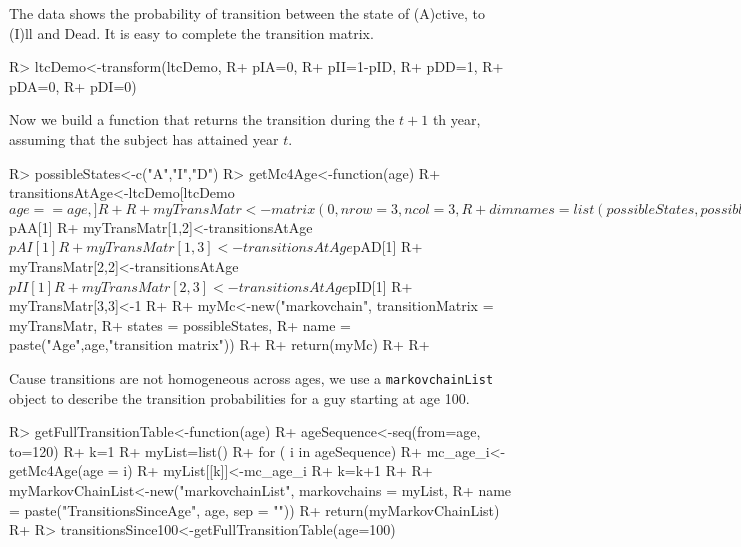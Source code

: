 \documentclass[
  nojss]{jss}
\begin{document}
The data shows the probability of transition between the state of (A)ctive, to (I)ll and Dead. It is easy to complete the
transition matrix.

\begin{CodeChunk}

\begin{CodeInput}
R> ltcDemo<-transform(ltcDemo,
R+                    pIA=0,
R+                    pII=1-pID,
R+                    pDD=1,
R+                    pDA=0,
R+                    pDI=0)
\end{CodeInput}
\end{CodeChunk}

Now we build a function that returns the transition during the \(t+1\) th year, assuming that the subject has attained year \(t\).

\begin{CodeChunk}

\begin{CodeInput}
R> possibleStates<-c("A","I","D")
R> getMc4Age<-function(age) {
R+   transitionsAtAge<-ltcDemo[ltcDemo$age==age,]
R+   
R+   myTransMatr<-matrix(0, nrow=3,ncol = 3,
R+                       dimnames = list(possibleStates, possibleStates))
R+   myTransMatr[1,1]<-transitionsAtAge$pAA[1]
R+   myTransMatr[1,2]<-transitionsAtAge$pAI[1]
R+   myTransMatr[1,3]<-transitionsAtAge$pAD[1]
R+   myTransMatr[2,2]<-transitionsAtAge$pII[1]
R+   myTransMatr[2,3]<-transitionsAtAge$pID[1]
R+   myTransMatr[3,3]<-1
R+   
R+   myMc<-new("markovchain", transitionMatrix = myTransMatr,
R+             states = possibleStates,
R+             name = paste("Age",age,"transition matrix"))
R+   
R+   return(myMc)
R+ 
R+ }
\end{CodeInput}
\end{CodeChunk}

Cause transitions are not homogeneous across ages, we use a \texttt{markovchainList} object to describe the transition probabilities for a guy starting at age 100.

\begin{CodeChunk}

\begin{CodeInput}
R> getFullTransitionTable<-function(age){
R+   ageSequence<-seq(from=age, to=120)
R+   k=1
R+   myList=list()
R+   for ( i in ageSequence) {
R+     mc_age_i<-getMc4Age(age = i)
R+     myList[[k]]<-mc_age_i
R+     k=k+1
R+   }
R+   myMarkovChainList<-new("markovchainList", markovchains = myList,
R+                          name = paste("TransitionsSinceAge", age, sep = ""))
R+   return(myMarkovChainList)
R+ }
R> transitionsSince100<-getFullTransitionTable(age=100)
\end{CodeInput}
\end{CodeChunk}
\end{document}
